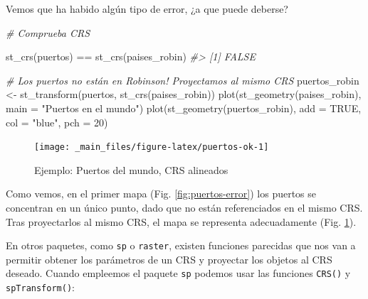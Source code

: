 \documentclass[
]{book}
\newenvironment{Shaded}{\begin{snugshade}}{\end{snugshade}}
\newcommand{\AttributeTok}[1]{\textcolor[rgb]{0.77,0.63,0.00}{#1}}
\newcommand{\CommentTok}[1]{\textcolor[rgb]{0.56,0.35,0.01}{\textit{#1}}}
\newcommand{\ConstantTok}[1]{\textcolor[rgb]{0.00,0.00,0.00}{#1}}
\newcommand{\DecValTok}[1]{\textcolor[rgb]{0.00,0.00,0.81}{#1}}
\newcommand{\FunctionTok}[1]{\textcolor[rgb]{0.00,0.00,0.00}{#1}}
\newcommand{\NormalTok}[1]{#1}
\newcommand{\OtherTok}[1]{\textcolor[rgb]{0.56,0.35,0.01}{#1}}
\newcommand{\SpecialCharTok}[1]{\textcolor[rgb]{0.00,0.00,0.00}{#1}}
\newcommand{\StringTok}[1]{\textcolor[rgb]{0.31,0.60,0.02}{#1}}
\begin{document}
Vemos que ha habido algún tipo de error, ¿a que puede deberse?

\begin{Shaded}
\begin{Highlighting}[]
\CommentTok{\# Comprueba CRS}

\FunctionTok{st\_crs}\NormalTok{(puertos) }\SpecialCharTok{==} \FunctionTok{st\_crs}\NormalTok{(paises\_robin)}
\CommentTok{\#\textgreater{} [1] FALSE}

\CommentTok{\# Los puertos no están en Robinson! Proyectamos al mismo CRS}
\NormalTok{puertos\_robin }\OtherTok{\textless{}{-}} \FunctionTok{st\_transform}\NormalTok{(puertos, }\FunctionTok{st\_crs}\NormalTok{(paises\_robin))}
\FunctionTok{plot}\NormalTok{(}\FunctionTok{st\_geometry}\NormalTok{(paises\_robin), }\AttributeTok{main =} \StringTok{"Puertos en el mundo"}\NormalTok{)}
\FunctionTok{plot}\NormalTok{(}\FunctionTok{st\_geometry}\NormalTok{(puertos\_robin), }\AttributeTok{add =} \ConstantTok{TRUE}\NormalTok{, }\AttributeTok{col =} \StringTok{"blue"}\NormalTok{, }\AttributeTok{pch =} \DecValTok{20}\NormalTok{)}
\end{Highlighting}
\end{Shaded}

\begin{figure}

{\centering \texttt{[image: \_main\_files/figure-latex/puertos-ok-1]} 

}

\caption{Ejemplo: Puertos del mundo, CRS alineados}\label{fig:puertos-ok}
\end{figure}

Como vemos, en el primer mapa (Fig. \ref{fig:puertos-error}) los puertos se
concentran en un único punto, dado que no están referenciados en el mismo CRS.
Tras proyectarlos al mismo CRS, el mapa se representa adecuadamente (Fig.
\ref{fig:puertos-ok}).

En otros paquetes, como \texttt{sp} o \texttt{raster}, existen funciones parecidas que nos van
a permitir obtener los parámetros de un CRS y proyectar los objetos al CRS
deseado. Cuando empleemos el paquete \texttt{sp} podemos usar las funciones \texttt{CRS()} y
\texttt{spTransform()}:

\begin{Shaded}
\end{Shaded}
\end{document}
